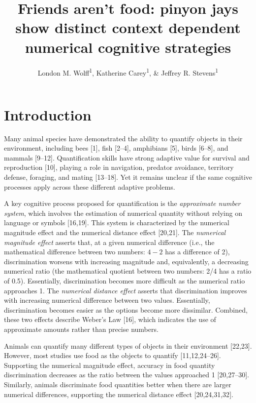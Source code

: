 \documentclass[
  ,doc,floatsintext]{apa6}
\title{Friends aren't food: pinyon jays show distinct context dependent numerical cognitive strategies}
\author{London M. Wolff\textsuperscript{1}, Katherine Carey\textsuperscript{1}, \& Jeffrey R. Stevens\textsuperscript{1}}
\date{}
\affiliation{\vspace{0.5cm}\textsuperscript{1} Department of Psychology, Center for Brain, Biology \& Behavior, University of Nebraska, Lincoln, Lincoln, NE, USA}
\begin{document}
\maketitle

\hypertarget{introduction}{%
\section{Introduction}\label{introduction}}

Many animal species have demonstrated the ability to quantify objects in their environment, including bees {[}1{]}, fish {[}2--4{]}, amphibians {[}5{]}, birds {[}6--8{]}, and mammals {[}9--12{]}. Quantification skills have strong adaptive value for survival and reproduction {[}10{]}, playing a role in navigation, predator avoidance, territory defense, foraging, and mating {[}13--18{]}. Yet it remains unclear if the same cognitive processes apply across these different adaptive problems.

A key cognitive process proposed for quantification is the \emph{approximate number system}, which involves the estimation of numerical quantity without relying on language or symbols {[}16,19{]}. This system is characterized by the numerical magnitude effect and the numerical distance effect {[}20,21{]}. The \emph{numerical magnitude effect} asserts that, at a given numerical difference (i.e., the mathematical difference between two numbers: \(4-2\) has a difference of 2), discrimination worsens with increasing magnitude and, equivalently, a decreasing numerical ratio (the mathematical quotient between two numbers: 2/4 has a ratio of 0.5). Essentially, discrimination becomes more difficult as the numerical ratio approaches 1. The \emph{numerical distance effect} asserts that discrimination improves with increasing numerical difference between two values. Essentially, discrimination becomes easier as the options become more dissimilar. Combined, these two effects describe Weber's Law {[}16{]}, which indicates the use of approximate amounts rather than precise numbers.

Animals can quantify many different types of objects in their environment {[}22,23{]}. However, most studies use food as the objects to quantify {[}11,12,24--26{]}. Supporting the numerical magnitude effect, accuracy in food quantity discrimination decreases as the ratio between the values approached 1 {[}20,27--30{]}. Similarly, animals discriminate food quantities better when there are larger numerical differences, supporting the numerical distance effect {[}20,24,31,32{]}.
\end{document}
